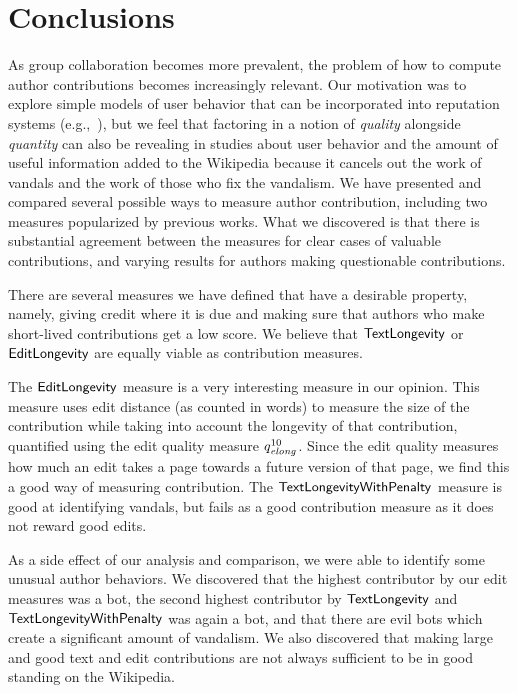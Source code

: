 \section{Conclusions}

As group collaboration becomes more prevalent,
the problem of how to compute author contributions
becomes increasingly relevant.
Our motivation was to explore simple models of user behavior
that can be incorporated into reputation
systems (e.g.,~\cite{Adler2007}),
but we feel that factoring in a notion
of \textit{quality} alongside \textit{quantity}
can also be revealing in studies about
user behavior and the amount of useful information
added to the Wikipedia because it cancels out
the work of vandals and the work of those who
fix the vandalism.
We have presented and compared several possible ways to
measure author contribution, including
two measures popularized by previous works.
What we discovered is that there is substantial
agreement between the measures for clear
cases of valuable contributions, and
varying results for authors making
questionable contributions.

There are several measures we have defined that
have a desirable property, namely, giving credit
where it is due and making sure that authors who make short-lived 
contributions get a low score.
We believe that $\mathsf{TextLongevity}$ or $\mathsf{EditLongevity}$ are
equally viable as contribution measures.

The $\mathsf{EditLongevity}$ measure is a very interesting measure
in our opinion.
This measure uses edit distance (as counted in words)
to measure the size of the contribution while taking into
account the longevity of that contribution, quantified
using the edit quality measure $\quality{elong}{10}{}$.
Since the edit quality measures how much an edit takes a 
page towards a future version of that page, we find this
a good way of measuring contribution.
The $\mathsf{TextLongevityWithPenalty}$ measure is good at identifying vandals,
but fails as a good contribution measure as it does not
reward good edits.

As a side effect of our analysis and comparison, we were
able to identify some unusual author behaviors.
We discovered that the highest contributor by our edit 
measures was a bot, the second highest contributor by 
$\mathsf{TextLongevity}$ and $\mathsf{TextLongevityWithPenalty}$ was again a bot, and that there 
are evil bots which create a significant amount of vandalism.
We also discovered that making large and good text and edit
contributions are not always sufficient to be in good 
standing on the Wikipedia.


